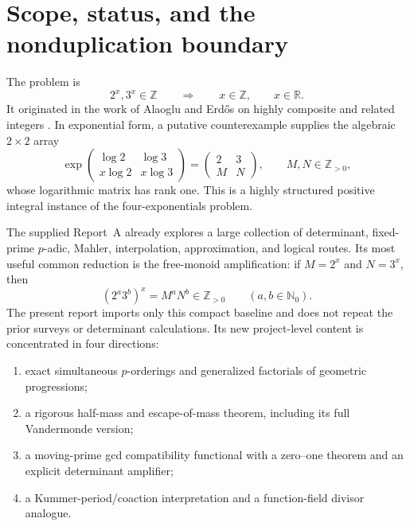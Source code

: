 \documentclass[11pt]{article}
\theoremstyle{definition}
\theoremstyle{remark}
\newcommand{\N}{\mathbb N}
\newcommand{\Z}{\mathbb Z}
\newcommand{\R}{\mathbb R}
\begin{document}
\tableofcontents
\newpage

\section{Scope, status, and the nonduplication boundary}

The problem is
\begin{equation}\label{eq:AE}
 2^x,3^x\in\Z \qquad\Longrightarrow\qquad x\in\Z,
 \qquad x\in\R.
\end{equation}
It originated in the work of Alaoglu and Erd\H{o}s on highly composite and
related integers \cite{AlaogluErdos1944}.  In exponential form, a putative
counterexample supplies the algebraic $2\times2$ array
\[
 \exp\!\begin{pmatrix}
     \log 2 & \log 3\\
     x\log 2 & x\log 3
 \end{pmatrix}
 =\begin{pmatrix}2&3\\M&N\end{pmatrix},
 \qquad M,N\in\Z_{>0},
\]
whose logarithmic matrix has rank one.  This is a highly structured positive
integral instance of the four-exponentials problem.

The supplied Report~A already explores a large collection of determinant,
fixed-prime $p$-adic, Mahler, interpolation, approximation, and logical
routes.  Its most useful common reduction is the free-monoid amplification:
if $M=2^x$ and $N=3^x$, then
\begin{equation}\label{eq:monoid-map}
  (2^a3^b)^x=M^aN^b\in\Z_{>0}
  \qquad(a,b\in\N_0).
\end{equation}
The present report imports only this compact baseline and does not repeat the
prior surveys or determinant calculations.  Its new project-level content is
concentrated in four directions:
\begin{enumerate}
 \item exact simultaneous $p$-orderings and generalized factorials of
       geometric progressions;
 \item a rigorous half-mass and escape-of-mass theorem, including its full
       Vandermonde version;
 \item a moving-prime gcd compatibility functional with a zero--one theorem
       and an explicit determinant amplifier;
 \item a Kummer-period/coaction interpretation and a function-field divisor
       analogue.
\end{enumerate}
\end{document}
